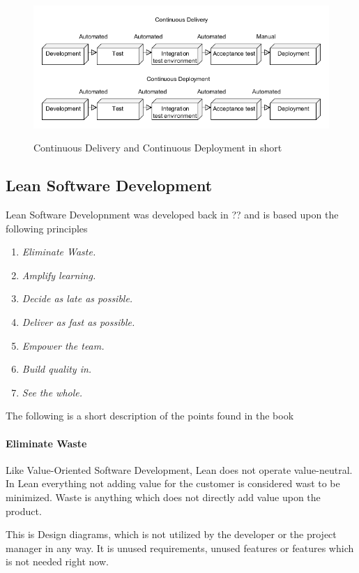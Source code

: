 \documentclass{sig-alternate}
\begin{document}
\begin{figure}
\caption{Continuous Delivery and Continuous Deployment in short}
\includegraphics[scale=0.37]{Umlet/DeliveryandDeployment}
\label{fig:deliverydeploment}
\end{figure}


\subsection{Lean Software Development}
\label{lean}
Lean Software Developnment\cite{poppendieck:lean} was developed back in ?? and is based upon the following principles

\begin{enumerate}
\item \textit{Eliminate Waste.}
\item \textit{Amplify learning.} 
\item \textit{Decide as late as possible.}
\item \textit{Deliver as fast as possible.}
\item \textit{Empower the team.}
\item \textit{Build quality in.} 
\item \textit{See the whole.} 
\end{enumerate}

The following is a short description of the points found in the book \cite{poppendieck:lean}

\paragraph{Eliminate Waste}
Like Value-Oriented Software Development, Lean does not operate value-neutral. In Lean everything not adding value for the customer is considered wast to be minimized.
Waste is anything which does not directly add value upon the product. 

This is Design diagrams, which is not utilized by the developer or the project manager in any way. 
It is unused requirements, unused features or features which is not needed right now. 
\end{document}
